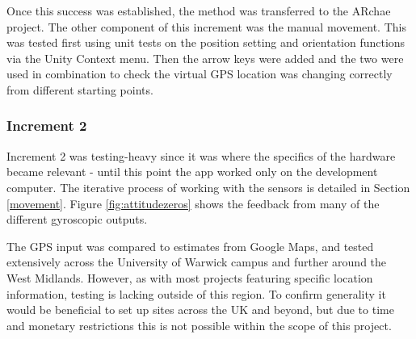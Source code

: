 \documentclass[12pt, a4paper]{article}
\begin{document}
Once this success was established, the method was transferred to the ARchae project. The other component of this increment was the manual movement. This was tested first using unit tests on the position setting and orientation functions via the Unity Context menu. Then the arrow keys were added and the two were used in combination to check the virtual GPS location was changing correctly from different starting points.

\subsubsection{Increment 2}
Increment 2 was testing-heavy since it was where the specifics of the hardware became relevant - until this point the app worked only on the development computer. The iterative process of working with the sensors is detailed in Section \ref{movement}. Figure \ref{fig:attitudezeros} shows the feedback from many of the different gyroscopic outputs.

The GPS input was compared to estimates from Google Maps, and tested extensively across the University of Warwick campus and further around the West Midlands. However, as with most projects featuring specific location information, testing is lacking outside of this region. To confirm generality it would be beneficial to set up sites across the UK and beyond, but due to time and monetary restrictions this is not possible within the scope of this project.
\end{document}
